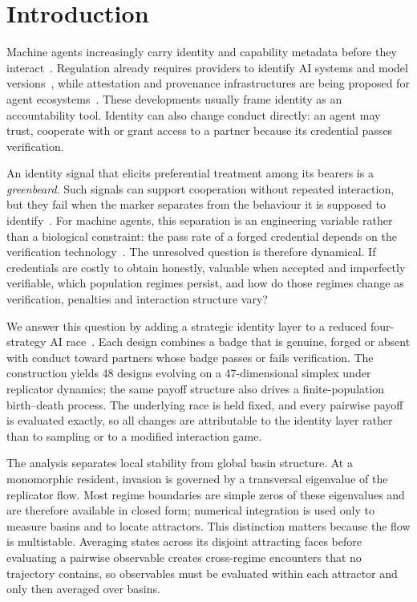\documentclass[a4paper,fleqn,longmktitle]{cas-sc}
\theoremstyle{plain}
\theoremstyle{definition}
\begin{document}
\maketitle
\section{Introduction}
\label{sec:intro}

Machine agents increasingly carry identity and capability metadata before they
interact~\citep{a2a2026spec}. Regulation already requires providers to identify
AI systems and model versions~\citep{euaiact2024}, while attestation and
provenance infrastructures are being proposed for agent
ecosystems~\citep{chan2024visibility,chan2025infrastructure,shavit2023practices}.
These developments usually frame identity as an accountability tool. Identity
can also change conduct directly: an agent may trust, cooperate with or grant
access to a partner because its credential passes verification.

An identity signal that elicits preferential treatment among its bearers is a
\emph{greenbeard}. Such signals can support cooperation without repeated
interaction, but they fail when the marker separates from the behaviour it is
supposed to identify~\citep{riolo2001evolution,jansen2006altruism,gardner2010greenbeards}.
For machine agents, this separation is an engineering variable rather than a
biological constraint: the pass rate of a forged credential depends on the
verification technology~\citep{jovanovic2024watermarkstealing,anbiaee2026threatmodeling}.
The unresolved question is therefore dynamical. If credentials are costly to
obtain honestly, valuable when accepted and imperfectly verifiable, which
population regimes persist, and how do those regimes change as verification,
penalties and interaction structure vary?

We answer this question by adding a strategic identity layer to a reduced
four-strategy AI race~\citep{domingos2026falling}. Each design combines a badge
that is genuine, forged or absent with conduct toward partners whose badge
passes or fails verification. The construction yields 48 designs evolving on
a 47-dimensional simplex under replicator dynamics; the same payoff structure
also drives a finite-population birth--death process. The underlying race is
held fixed, and every pairwise payoff is evaluated exactly, so all changes are
attributable to the identity layer rather than to sampling or to a modified
interaction game.

The analysis separates local stability from global basin structure. At a
monomorphic resident, invasion is governed by a transversal eigenvalue of the
replicator flow. Most regime boundaries are simple zeros of these eigenvalues
and are therefore available in closed form; numerical integration is used only
to measure basins and to locate attractors. This distinction matters because
the flow is multistable. Averaging states across its disjoint attracting faces
before evaluating a pairwise observable creates cross-regime encounters that
no trajectory contains, so observables must be evaluated within each attractor
and only then averaged over basins.
\end{document}
